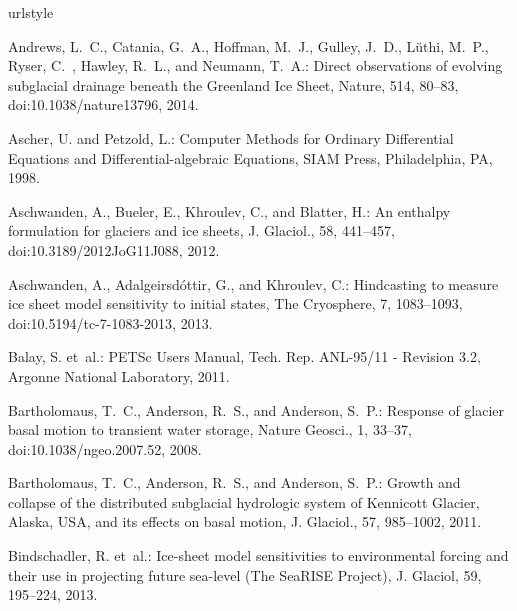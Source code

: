 \documentclass[gmd]{copernicus}   %
\begin{document}
\begin{thebibliography}{}
\providecommand{\natexlab}[1]{#1}
\providecommand{\url}[1]{{\tt #1}}
\providecommand{\urlprefix}{URL }
\expandafter\ifx\csname urlstyle\endcsname\relax
  \providecommand{\doi}[1]{doi:\discretionary{}{}{}#1}\else
  \providecommand{\doi}{doi:\discretionary{}{}{}\begingroup
  \urlstyle{rm}\Url}\fi


Andrews, L.~C., Catania, G.~A., Hoffman, M.~J., Gulley, J.~D., L\"uthi, M.~P.,
  Ryser, C.~, Hawley, R.~L., and Neumann, T.~A.: Direct observations of evolving
  subglacial drainage beneath the {G}reenland {I}ce {S}heet, Nature, 514, 80--83,
  \doi{10.1038/nature13796}, 2014.

Ascher, U. and Petzold, L.: Computer {M}ethods for {O}rdinary {D}ifferential
  {E}quations and {D}ifferential-algebraic {E}quations, SIAM Press,
  Philadelphia, PA, 1998.

Aschwanden, A., Bueler, E., Khroulev, C., and Blatter, H.: An enthalpy
  formulation for glaciers and ice sheets, J. Glaciol., 58, 441--457,
  \doi{10.3189/2012JoG11J088}, 2012.

Aschwanden, A., Adalgeirsd{\'o}ttir, G., and Khroulev, C.: Hindcasting to
  measure ice sheet model sensitivity to initial states, The Cryosphere, 7,
  1083--1093, \doi{10.5194/tc-7-1083-2013}, 2013.

Balay, S. et~al.: {PETS}c {U}sers {M}anual, Tech. Rep. ANL-95/11 - Revision
  3.2, Argonne National Laboratory, 2011.

Bartholomaus, T.~C., Anderson, R.~S., and Anderson, S.~P.: Response of glacier
  basal motion to transient water storage, Nature Geosci., 1, 33--37,
  \doi{10.1038/ngeo.2007.52}, 2008.

Bartholomaus, T.~C., Anderson, R.~S., and Anderson, S.~P.: Growth and collapse
  of the distributed subglacial hydrologic system of {K}ennicott {G}lacier,
  {A}laska, {USA}, and its effects on basal motion, J. Glaciol., 57, 985--1002,
  2011.

Bindschadler, R. et~al.: Ice-sheet model sensitivities to environmental forcing
  and their use in projecting future sea-level ({T}he {S}ea{RISE} {P}roject),
  J. Glaciol, 59, 195--224, 2013.


\end{thebibliography}
\end{document}
